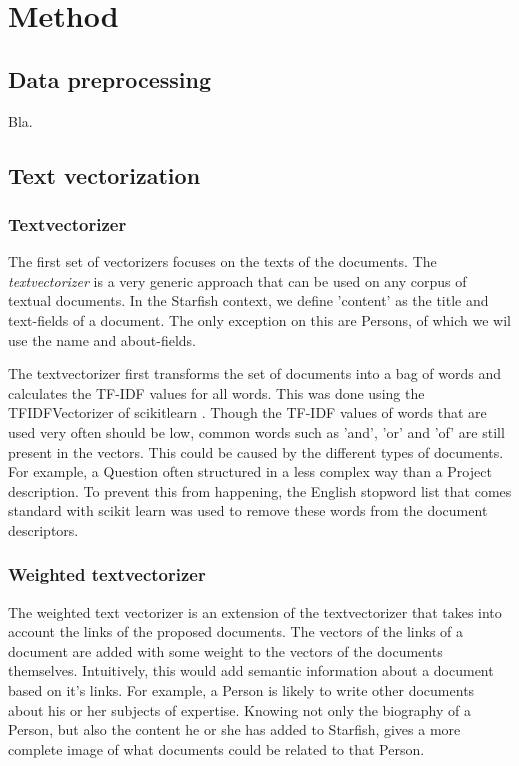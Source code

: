 \section{Method}

\subsection{Data preprocessing}
Bla.

\subsection{Text vectorization}
\subsubsection{Textvectorizer}

The first set of vectorizers focuses on the texts of the documents. The \emph{textvectorizer} is a very generic approach that can be used on any corpus of textual documents. In the Starfish context, we define 'content' as the title and text-fields of a document. The only exception on this are Persons, of which we wil use the name and about-fields. 

The textvectorizer first transforms the set of documents into a bag of words and calculates the TF-IDF values for all words. This was done using the TFIDFVectorizer of scikitlearn \citep{scikit-learn}.  Though the TF-IDF values of words that are used very often should be low, common words such as 'and', 'or' and 'of' are still present in the vectors. This could be caused by the different types of documents. For example, a Question often structured in a less complex way than a Project description. To prevent this from happening, the English stopword list that comes standard with scikit learn was used to remove these words from the document descriptors.

\subsubsection{Weighted textvectorizer}
The weighted text vectorizer is an extension of the textvectorizer that takes into account the links of the proposed documents. The vectors of the links of a document are added with some weight to the vectors of the documents themselves. Intuitively, this would add semantic information about a document based on it's links. For example, a Person is likely to write other documents about his or her subjects of expertise. Knowing not only the biography of a Person, but also the content he or she has added to Starfish, gives a more complete image of what documents could be related to that Person.

